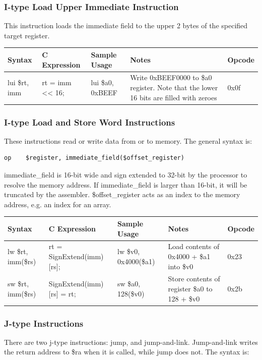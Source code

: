 \documentclass{article}
\begin{document}
\subsubsection{I-type Load Upper Immediate Instruction}
This instruction loads the immediate field to the upper 2 bytes of the specified target register. 

\begin{tabularx}{\linewidth}{|X|X|X|X|X|}
\hline
Syntax & C Expression & Sample Usage & Notes & Opcode \\
\hline
lui \$rt, imm & rt = imm << 16; & lui \$a0, 0xBEEF & Write 0xBEEF0000 to \$a0 register. Note that the lower 16 bits are filled with zeroes & 0x0f \\
\hline
\end{tabularx}

\subsubsection{I-type Load and Store Word Instructions}
These instructions read or write data from or to memory. The general syntax is: 

\begin{verbatim}
op    $register, immediate_field($offset_register)
\end{verbatim}

immediate\_field is 16-bit wide and sign extended to 32-bit by the processor to resolve the memory address. If immediate\_field is larger than 16-bit, it will be truncated by the assembler. \$offset\_register acts as an index to the memory address, e.g. an index for an array. 

\begin{tabularx}{\linewidth}{|X|X|X|X|X|}
\hline
Syntax & C Expression & Sample Usage & Notes & Opcode \\
\hline
lw \$rt, imm(\$rs) & rt = SignExtend(imm)[rs]; & lw \$v0, 0x4000(\$a1) & Load contents of 0x4000 + \$a1 into \$v0 & 0x23 \\
sw \$rt, imm(\$rs) & SignExtend(imm)[rs] = rt; & sw \$a0, 128(\$v0) & Store contents of register \$a0 to 128 + \$v0 & 0x2b \\
\hline
\end{tabularx}

\subsubsection{J-type Instructions}
There are two j-type instructions: jump, and jump-and-link. Jump-and-link writes the return address to \$ra when it is called, while jump does not. The syntax is: 
\end{document}
